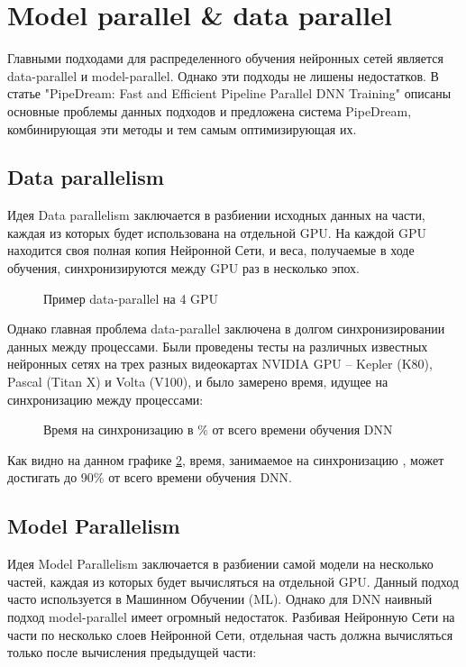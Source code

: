 
\newpage
\section{Model parallel \& data parallel}
Главными подходами для распределенного обучения нейронных сетей является data-parallel и model-parallel. Однако эти подходы не лишены недостатков. В статье "PipeDream: Fast and Efficient Pipeline Parallel DNN Training"\cite{pipedream} описаны основные проблемы данных подходов и предложена система PipeDream, комбинирующая эти методы и тем самым оптимизирующая их.

\subsection{Data parallelism}
Идея Data parallelism заключается в разбиении исходных данных на части, каждая из которых будет использована на отдельной GPU. На каждой GPU находится своя полная копия Нейронной Сети, и веса, получаемые в ходе обучения, синхронизируются между GPU раз в несколько эпох.


\begin{figure}[h]%
	\centering
	\caption{Пример data-parallel на 4 GPU}
	\label{data_parallel} %
\end{figure}


Однако главная проблема data-parallel заключена в долгом синхронизировании данных между процессами. Были проведены тесты на различных известных нейронных сетях на трех разных видеокартах NVIDIA GPU -- Kepler (K80), Pascal (Titan X) и Volta (V100), и было замерено время, идущее на синхронизацию между процессами:

\begin{figure}[h]%
	\centering
	\caption{Время на синхронизацию в \% от всего времени обучения DNN}
	\label{communication_overhead} %
\end{figure}

Как видно на данном графике \ref{communication_overhead}, время, занимаемое на синхронизацию , может достигать до 90\% от всего времени обучения DNN.

\newpage
\subsection{Model Parallelism}
Идея Model Parallelism заключается в разбиении самой модели на несколько частей, каждая из которых будет вычисляться на отдельной GPU. Данный подход часто используется в Машинном Обучении (ML). Однако для DNN наивный подход model-parallel имеет огромный недостаток. Разбивая Нейронную Сети на части по несколько слоев Нейронной Сети, отдельная часть должна вычисляться только после вычисления предыдущей части:

